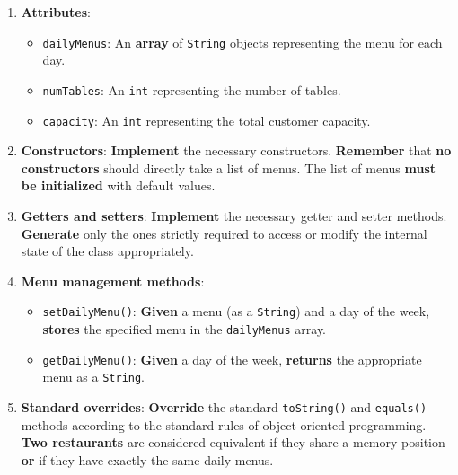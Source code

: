 \begin{enumerate}

    \item \textbf{Attributes}:

        \begin{itemize}

            \item \texttt{dailyMenus}: An \textbf{array} of \texttt{String} objects representing the menu for each day.

            \item \texttt{numTables}: An \texttt{int} representing the number of tables.

            \item \texttt{capacity}: An \texttt{int} representing the total customer capacity.

        \end{itemize}

    \item \textbf{Constructors}: \textbf{Implement} the necessary constructors. \textbf{Remember} that \textbf{no constructors} should directly take a list of menus. The list of menus \textbf{must be initialized} with default values.

    \item \textbf{Getters and setters}: \textbf{Implement} the necessary getter and setter methods. \textbf{Generate} only the ones strictly required to access or modify the internal state of the class appropriately.

    \item \textbf{Menu management methods}:

        \begin{itemize}

            \item \texttt{setDailyMenu()}: \textbf{Given} a menu (as a \texttt{String}) and a day of the week, \textbf{stores} the specified menu in the \texttt{dailyMenus} array.

            \item \texttt{getDailyMenu()}: \textbf{Given} a day of the week, \textbf{returns} the appropriate menu as a \texttt{String}.

        \end{itemize}

    \item \textbf{Standard overrides}: \textbf{Override} the standard \texttt{toString()} and \texttt{equals()} methods according to the standard rules of object-oriented programming. \textbf{Two restaurants} are considered equivalent if they share a memory position \textbf{or} if they have exactly the same daily menus.

\end{enumerate}

